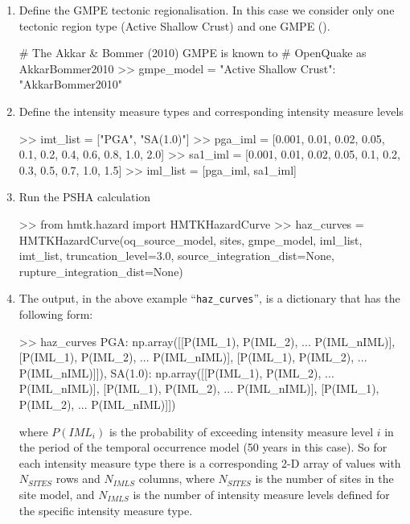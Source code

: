 \begin{enumerate}
\item Define the GMPE tectonic regionalisation. In this case we consider only one tectonic region type (Active Shallow Crust) and one GMPE (\cite{akkar2010}). 

\begin{python}[frame=single]
# The Akkar & Bommer (2010) GMPE is known to 
# OpenQuake as AkkarBommer2010
>> gmpe_model = {"Active Shallow Crust": "AkkarBommer2010"}
\end{python}

\item Define the intensity measure types and corresponding intensity measure levels

\begin{python}[frame=single]
>> imt_list = ["PGA", "SA(1.0)"]
>> pga_iml = [0.001, 0.01, 0.02, 0.05, 0.1, 
                    0.2, 0.4, 0.6, 0.8, 1.0, 2.0]
>> sa1_iml = [0.001, 0.01, 0.02, 0.05, 0.1,
                    0.2, 0.3, 0.5, 0.7, 1.0, 1.5]
>> iml_list = [pga_iml, sa1_iml]
\end{python}

\item Run the PSHA calculation

\begin{python}[frame=single]
>> from hmtk.hazard import HMTKHazardCurve
>> haz_curves = HMTKHazardCurve(oq_source_model,
                                sites,
                                gmpe_model,
                                iml_list,
                                imt_list,
                                truncation_level=3.0,
                                source_integration_dist=None,
                                rupture_integration_dist=None)
\end{python}

\item The output, in the above example ``\verb=haz_curves='', is a dictionary that has the following form:

\begin{python}[frame=single]

>> haz_curves
{PGA: np.array([[P(IML_1), P(IML_2), ... P(IML_nIML)],
                [P(IML_1), P(IML_2), ... P(IML_nIML)],
                [P(IML_1), P(IML_2), ... P(IML_nIML)]]),
SA(1.0): np.array([[P(IML_1), P(IML_2), ... P(IML_nIML)],
                   [P(IML_1), P(IML_2), ... P(IML_nIML)],
                   [P(IML_1), P(IML_2), ... P(IML_nIML)]])}
\end{python}

where $P(IML_i)$ is the probability of exceeding intensity measure level $i$ in the period of the temporal occurrence model (50 years in this case). So for each intensity measure type there is a corresponding 2-D array of values with $N_{SITES}$ rows and $N_{IMLS}$ columns, where $N_{SITES}$ is the number of sites in the site model, and $N_{IMLS}$ is the number of intensity measure levels defined for the specific intensity measure type.

\end{enumerate}

